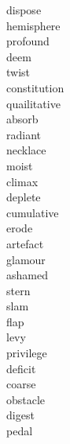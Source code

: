 \documentclass[a4paper, 10pt]{ctexart}
\begin{document}
\begin{multicols*}{2}
\begin{description}
\item[dispose]

\item[hemisphere]

\item[profound]

\item[deem]

\item[twist]

\item[constitution]

\item[quailitative]

\item[absorb]

\item[radiant]

\item[necklace]

\item[moist]

\item[climax]

\item[deplete]

\item[cumulative]

\item[erode]

\item[artefact]

\item[glamour]

\item[ashamed]

\item[stern]

\item[slam]

\item[flap]

\item[levy]

\item[privilege]

\item[deficit]

\item[coarse]

\item[obstacle]

\item[digest]

\item[pedal]


\end{description}
\end{multicols*}
\end{document}

